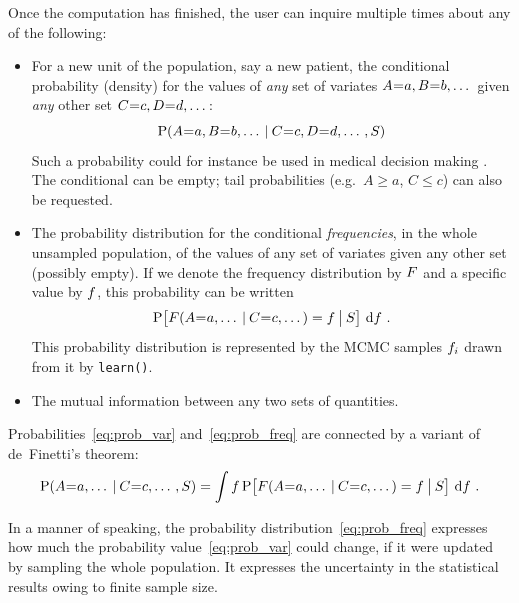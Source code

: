 Once the computation has finished, the user can inquire multiple times about any of the following:
\vspace{-\topsep}
\setlength{\leftmargini}{17.62pt}
\begin{itemize}
  \itemsep0.5ex
\item For a new unit of the population, say a new patient, the conditional probability (density) for the values of \emph{any} set of variates $A \mo a, B \mo b, \dotso$ given \emph{any} other set $C \mo c, D \mo d, \dotso$:
  \begin{equation}\label{eq:prob_var}
    \P(A \mo a, B \mo b, \dotso \|C \mo c, D \mo d, \dotso , S)
  \end{equation}
  Such a probability could for instance be used in medical decision making \citep{soxetal1988_r2024,huninketal2001_r2014}. The conditional can be empty; tail probabilities (e.g.\ $A \ge a$, $C \le c$) can also be requested.

\item The probability distribution for the conditional \emph{frequencies}, in the whole unsampled population, of the values of any set of variates given any other set (possibly empty). If we denote the frequency distribution by $F$ and a specific value by $f$, this probability can be written
  \begin{equation}\label{eq:prob_freq}
    \P\bigl[ \yF(A \mo a, \dotso \|C \mo c, \dotso) = \yf \|[\big] S\bigr]
    \,\di\yf \ .
  \end{equation}
This probability distribution is represented by the MCMC samples $f_{i}$ drawn from it by \texttt{learn()}.

\item The mutual information \citep[Ch.~8]{mackay1995_r2005} between any two sets of quantities.
\end{itemize}
\vspace{-\topsep}

Probabilities~\eqref{eq:prob_var} and~\eqref{eq:prob_freq} are connected by a variant of de~Finetti's theorem:
\begin{equation}
  \label{eq:definetti1}
  \P(A \mo a, \dotso \|C \mo c, \dotso , S)  =
  \int \yf \,
  \P\bigl[ \yF(A \mo a, \dotso \|C \mo c, \dotso) = \yf \|[\big] S\bigr]
  \,\di\yf \ .
\end{equation}

In a manner of speaking, the probability distribution~\eqref{eq:prob_freq} expresses how much the probability value~\eqref{eq:prob_var} could change, if it were updated by sampling the whole population. It expresses the uncertainty in the statistical results owing to finite sample size.

